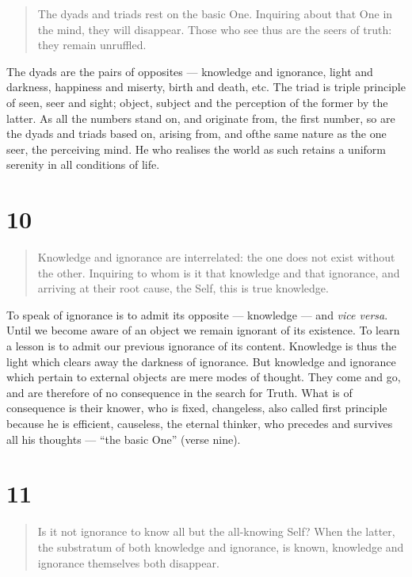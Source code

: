\documentclass[12pt]{report}
\begin{document}
\begin{quote}
The dyads and triads rest on the basic One. Inquiring about that One
in the mind, they will disappear. Those who see thus are the seers of
truth: they remain unruffled.
\end{quote}


The dyads are the pairs of opposites --- knowledge and ignorance,
light and darkness, happiness and miserty, birth and death, etc. The
triad is triple principle of seen, seer and sight; object, subject and
the perception of the former by the latter. As all the numbers stand
on, and originate from, the first number, so are the dyads and triads
based on, arising from, and ofthe same nature as the one seer, the
perceiving mind. He who realises the world as such retains a uniform
serenity in all conditions of life.


\section*{10}

\begin{quote}
Knowledge and ignorance are interrelated: the one does not exist
without the other. Inquiring to whom is it that knowledge and that
ignorance, and arriving at their root cause, the Self, this is true
knowledge. 
\end{quote}


To speak of ignorance is to admit its opposite --- knowledge --- and
\emph{vice versa}. Until we become aware of an object we remain
ignorant of its existence. To learn a lesson is to admit our previous
ignorance of its content. Knowledge is thus the light which clears
away the darkness of ignorance. But knowledge and ignorance which
pertain to external objects are mere modes of thought. They come and
go, and are therefore of no consequence in the search for Truth. What
is of consequence is their knower, who is fixed, changeless, also
called first principle because he is efficient, causeless, the eternal
thinker, who precedes and survives all his thoughts --- ``the basic
One'' (verse nine).

\section*{11}

\begin{quote}
Is it not ignorance to know all but the all-knowing Self? When the
latter, the substratum of both knowledge and ignorance, is known,
knowledge and ignorance themselves both disappear.
\end{quote}
\end{document}
